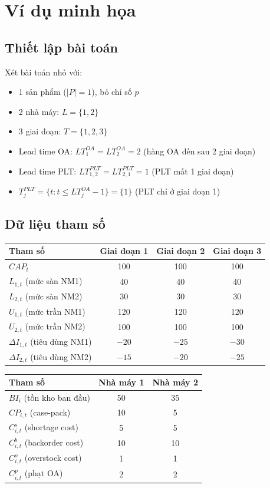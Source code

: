 
\section{Ví dụ minh họa}

\subsection{Thiết lập bài toán}

Xét bài toán nhỏ với:
\begin{itemize}
  \item 1 sản phẩm ($|P| = 1$), bỏ chỉ số $p$
  \item 2 nhà máy: $L = \{1, 2\}$
  \item 3 giai đoạn: $T = \{1, 2, 3\}$
  \item Lead time OA: $LT_1^{OA} = LT_2^{OA} = 2$ (hàng OA đến sau 2 giai đoạn)
  \item Lead time PLT: $LT_{1,2}^{PLT} = LT_{2,1}^{PLT} = 1$ (PLT mất 1 giai đoạn)
  \item $T_j^{PLT} = \{t : t \leq LT_j^{OA} - 1\} = \{1\}$ (PLT chỉ ở giai đoạn 1)
\end{itemize}

\subsection{Dữ liệu tham số}

\begin{center}
\begin{tabular}{lccc}
\toprule
\textbf{Tham số} & \textbf{Giai đoạn 1} & \textbf{Giai đoạn 2} & \textbf{Giai đoạn 3} \\
\midrule
$CAP_t$ & 100 & 100 & 100 \\
$L_{1,t}$ (mức sàn NM1) & 40 & 40 & 40 \\
$L_{2,t}$ (mức sàn NM2) & 30 & 30 & 30 \\
$U_{1,t}$ (mức trần NM1) & 120 & 120 & 120 \\
$U_{2,t}$ (mức trần NM2) & 100 & 100 & 100 \\
$\Delta I_{1,t}$ (tiêu dùng NM1) & $-20$ & $-25$ & $-30$ \\
$\Delta I_{2,t}$ (tiêu dùng NM2) & $-15$ & $-20$ & $-25$ \\
\bottomrule
\end{tabular}
\end{center}

\begin{center}
\begin{tabular}{lcc}
\toprule
\textbf{Tham số} & \textbf{Nhà máy 1} & \textbf{Nhà máy 2} \\
\midrule
$BI_i$ (tồn kho ban đầu) & 50 & 35 \\
$CP_{i,t}$ (case-pack) & 10 & 5 \\
$C^s_{i,t}$ (shortage cost) & 5 & 5 \\
$C^b_{i,t}$ (backorder cost) & 10 & 10 \\
$C^o_{i,t}$ (overstock cost) & 1 & 1 \\
$C^p_{i,t}$ (phạt OA) & 2 & 2 \\
\end{tabular}
\end{center}

